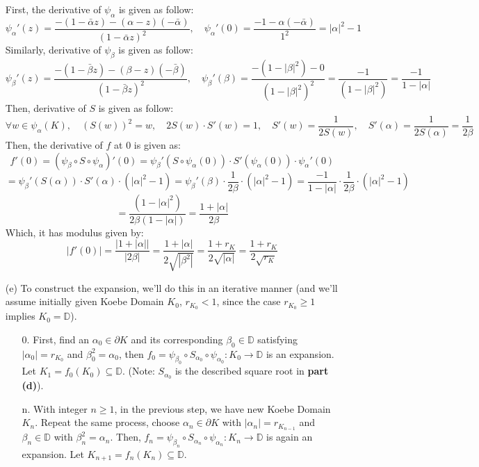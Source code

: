 \documentclass{article}
\begin{document}
\begin{itemize}
    First, the derivative of $\psi_\alpha$ is given as follow:
    $$\psi_\alpha'(z)=\frac{-(1-\bar{\alpha}z)-(\alpha-z)(-\bar{\alpha})}{(1-\bar{\alpha}z)^2},\quad \psi_\alpha'(0)=\frac{-1-\alpha(-\bar{\alpha})}{1^2}=|\alpha|^2-1$$
    Similarly, derivative of $\psi_\beta$ is given as follow:
    $$\psi_\beta'(z)=\frac{-(1-\bar{\beta}z)-(\beta-z)(-\bar{\beta})}{(1-\bar{\beta}z)^2},\quad \psi_\beta'(\beta)=\frac{-(1-|\beta|^2)-0}{(1-|\beta|^2)^2} = \frac{-1}{(1-|\beta|^2)}=\frac{-1}{1-|\alpha|}$$
    Then, derivative of $S$ is given as follow:
    $$\forall w\in \psi_\alpha(K),\quad (S(w))^2 = w,\quad 2S(w)\cdot S'(w)=1,\quad S'(w)=\frac{1}{2S(w)},\quad S'(\alpha)=\frac{1}{2S(\alpha)}=\frac{1}{2\beta}$$
    Then, the derivative of $f$ at $0$ is given as:
    $$f'(0)=(\psi_\beta\circ S\circ \psi_\alpha)'(0) = \psi_\beta'(S\circ \psi_\alpha(0))\cdot S'(\psi_\alpha(0))\cdot \psi_\alpha'(0)$$
    $$ = \psi_\beta'(S(\alpha))\cdot S'(\alpha)\cdot (|\alpha|^2-1) = \psi_\beta'(\beta)\cdot \frac{1}{2\beta}\cdot (|\alpha|^2-1) = \frac{-1}{1-|\alpha|}\cdot \frac{1}{2\beta}\cdot (|\alpha|^2-1)$$
    $$ = \frac{(1-|\alpha|^2)}{2\beta(1-|\alpha|)}=\frac{1+|\alpha|}{2\beta}$$
    Which, it has modulus given by:
    $$|f'(0)| = \frac{|1+|\alpha||}{|2\beta|} = \frac{1+|\alpha|}{2\sqrt{|\beta^2|}} = \frac{1+r_K}{2\sqrt{|\alpha|}}=\frac{1+r_K}{2\sqrt{r_K}}$$

    \hfil

    \hfil

    \item[(e)] To construct the expansion, we'll do this in an iterative manner (and we'll assume initially given Koebe Domain $K_0$, $r_{K_0}<1$, since the case $r_{K_0}\geq 1$ implies $K_0=\mathbb{D}$). 
    \begin{itemize}
        \item[0.] First, find an $\alpha_0\in \partial K$ and its corresponding $\beta_0\in \mathbb{D}$ satisfying $|\alpha_0|=r_{K_0}$ and $\beta_0^2=\alpha_0$, then $f_0=\psi_{\beta_0}\circ S_{\alpha_0}\circ \psi_{\alpha_0}:K_0\rightarrow\mathbb{D}$ is an expansion.
        Let $K_1=f_0(K_0)\subseteq \mathbb{D}$. (Note: $S_{\alpha_0}$ is the described square root in \textbf{part (d)}).

        \item[n.] With integer $n\geq 1$, in the previous step, we have new Koebe Domain $K_{n}$. Repeat the same process, choose $\alpha_n\in\partial K$ with $|\alpha_n|=r_{K_{n-1}}$ and $\beta_n\in\mathbb{D}$ with $\beta_n^2=\alpha_n$.
        Then, $f_n=\psi_{\beta_n}\circ S_{\alpha_n}\circ\psi_{\alpha_n}:K_n\rightarrow\mathbb{D}$ is again an expansion. Let $K_{n+1}=f_n(K_n)\subseteq\mathbb{D}$.
    \end{itemize}


\end{itemize}
\end{document}
